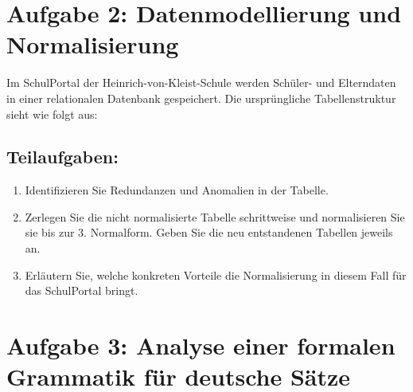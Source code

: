 \documentclass[a4paper,12pt]{article}
\begin{document}
	
\section*{Aufgabe 2: Datenmodellierung und Normalisierung}

Im SchulPortal der Heinrich-von-Kleist-Schule werden Schüler- und Elterndaten in einer relationalen Datenbank gespeichert. Die ursprüngliche Tabellenstruktur sieht wie folgt aus:

\begin{table}[h]
	\centering
	\caption{Ursprüngliche nicht normalisierte Tabelle}
\end{table}

\subsection*{Teilaufgaben:}

\begin{enumerate}
	\item Identifizieren Sie Redundanzen und Anomalien in der Tabelle.
	
	\item Zerlegen Sie die nicht normalisierte Tabelle schrittweise und normalisieren Sie sie bis zur 3. Normalform. Geben Sie die neu entstandenen Tabellen jeweils an.
	
	\item Erläutern Sie, welche konkreten Vorteile die Normalisierung in diesem Fall für das SchulPortal bringt.
\end{enumerate}


\section*{Aufgabe 3: Analyse einer formalen Grammatik für deutsche Sätze}
\end{document}

